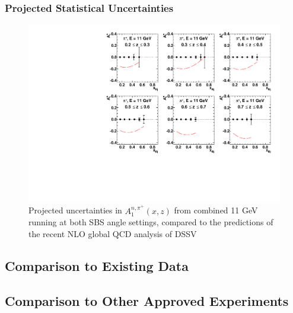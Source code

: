 \subsubsection{Projected Statistical Uncertainties}
\begin{figure}[h]
  \begin{center}
    \includegraphics[width=.98\textwidth]{figures/A1n_vs_x_E11_pip.pdf}
  \end{center}
  \caption{\label{A1n_pip_11gev.txt} Projected uncertainties in $A_1^{n,\pi^+}(x,z)$ from combined 11 GeV running at both SBS angle settings, compared to the predictions of the recent NLO global QCD analysis of DSSV~\cite{deFlorian:2014yva}}
\end{figure}
\subsection{Comparison to Existing Data}
\subsection{Comparison to Other Approved Experiments}

